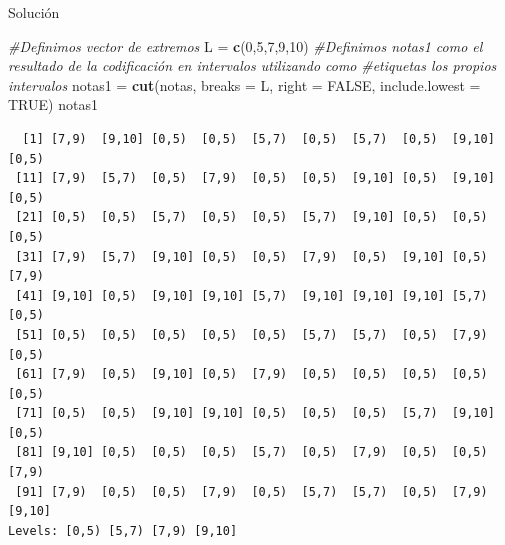 \documentclass[
  ignorenonframetext,
]{beamer}
\newenvironment{Shaded}{\begin{snugshade}}{\end{snugshade}}
\newcommand{\CommentTok}[1]{\textcolor[rgb]{0.56,0.35,0.01}{\textit{#1}}}
\newcommand{\DataTypeTok}[1]{\textcolor[rgb]{0.13,0.29,0.53}{#1}}
\newcommand{\DecValTok}[1]{\textcolor[rgb]{0.00,0.00,0.81}{#1}}
\newcommand{\KeywordTok}[1]{\textcolor[rgb]{0.13,0.29,0.53}{\textbf{#1}}}
\newcommand{\NormalTok}[1]{#1}
\newcommand{\OtherTok}[1]{\textcolor[rgb]{0.56,0.35,0.01}{#1}}
\newcommand{\StringTok}[1]{\textcolor[rgb]{0.31,0.60,0.02}{#1}}
\begin{document}
\begin{frame}[fragile]{Solución}
\protect\hypertarget{soluciuxf3n-17}{}

\begin{Shaded}
\begin{Highlighting}[]
\CommentTok{#Definimos vector de extremos}
\NormalTok{L =}\StringTok{ }\KeywordTok{c}\NormalTok{(}\DecValTok{0}\NormalTok{,}\DecValTok{5}\NormalTok{,}\DecValTok{7}\NormalTok{,}\DecValTok{9}\NormalTok{,}\DecValTok{10}\NormalTok{)}
\CommentTok{#Definimos notas1 como el resultado de la codificación en intervalos utilizando como }
\CommentTok{#etiquetas los propios intervalos}
\NormalTok{notas1 =}\StringTok{ }\KeywordTok{cut}\NormalTok{(notas, }\DataTypeTok{breaks =}\NormalTok{ L, }\DataTypeTok{right =} \OtherTok{FALSE}\NormalTok{, }\DataTypeTok{include.lowest =} \OtherTok{TRUE}\NormalTok{)}
\NormalTok{notas1}
\end{Highlighting}
\end{Shaded}

\begin{verbatim}
  [1] [7,9)  [9,10] [0,5)  [0,5)  [5,7)  [0,5)  [5,7)  [0,5)  [9,10] [0,5) 
 [11] [7,9)  [5,7)  [0,5)  [7,9)  [0,5)  [0,5)  [9,10] [0,5)  [9,10] [0,5) 
 [21] [0,5)  [0,5)  [5,7)  [0,5)  [0,5)  [5,7)  [9,10] [0,5)  [0,5)  [0,5) 
 [31] [7,9)  [5,7)  [9,10] [0,5)  [0,5)  [7,9)  [0,5)  [9,10] [0,5)  [7,9) 
 [41] [9,10] [0,5)  [9,10] [9,10] [5,7)  [9,10] [9,10] [9,10] [5,7)  [0,5) 
 [51] [0,5)  [0,5)  [0,5)  [0,5)  [0,5)  [5,7)  [5,7)  [0,5)  [7,9)  [0,5) 
 [61] [7,9)  [0,5)  [9,10] [0,5)  [7,9)  [0,5)  [0,5)  [0,5)  [0,5)  [0,5) 
 [71] [0,5)  [0,5)  [9,10] [9,10] [0,5)  [0,5)  [0,5)  [5,7)  [9,10] [0,5) 
 [81] [9,10] [0,5)  [0,5)  [0,5)  [5,7)  [0,5)  [7,9)  [0,5)  [0,5)  [7,9) 
 [91] [7,9)  [0,5)  [0,5)  [7,9)  [0,5)  [5,7)  [5,7)  [0,5)  [7,9)  [9,10]
Levels: [0,5) [5,7) [7,9) [9,10]
\end{verbatim}

\end{frame}
\end{document}
